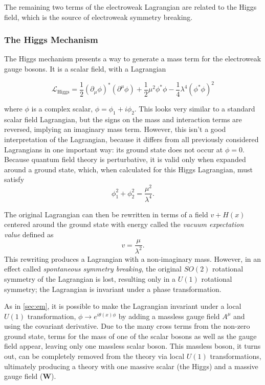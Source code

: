 The remaining two terms of the electroweak Lagrangian are related to the Higgs field, which is the source of electroweak symmetry breaking. 

\subsubsection{The Higgs Mechanism}

The Higgs mechanism presents a way to generate a mass term for the electroweak gauge bosons. It is a scalar field, with a Lagrangian 

\begin{equation}
\mathcal{L}_\text{Higgs} = \frac{1}{2}(\partial_\mu\phi)^*(\partial^\mu\phi) + \frac{1}{2}\mu^2\phi^*\phi - \frac{1}{4}\lambda^4(\phi^*\phi)^2
\end{equation}

where $\phi$ is a complex scalar, $\phi = \phi_1 + i\phi_2$. This looks very similar to a standard scalar field Lagrangian, but the signs on the mass and interaction terms are reversed, implying an imaginary mass term. However, this isn't a good interpretation of the Lagrangian, because it differs from all previously considered Lagrangians in one important way: its ground state does not occur at $\phi = 0$. Because quantum field theory is perturbative, it is valid only when expanded around a ground state, which, when calculated for this Higgs Lagrangian, must satisfy
%
\begin{equation}
\phi_1^2 + \phi_2^2 = \frac{\mu^2}{\lambda^4} . 
\end{equation}

The original Lagrangian can then be rewritten in terms of a field $v + H(x)$ centered around the ground state with energy called the \textit{vacuum expectation value} defined as 
%
\begin{equation}
v = \frac{\mu}{\lambda^2} . 
\end{equation}
%
This rewriting produces a Lagrangian with a non-imaginary mass. However, in an effect called \textit{spontaneous symmetry breaking}, the original $SO(2)$ rotational symmetry of the Lagrangian is lost, resulting only in a $U(1)$ rotational symmetry; the Lagrangian is invariant under a phase transformation.

As in \autoref{sec:em}, it is possible to make the Lagrangian invariant under a local $U(1)$ transformation, $\phi \rightarrow e^{i\theta(x)\phi}$ by adding a massless gauge field $A^\mu$ and using the covariant derivative. Due to the many cross terms from the non-zero ground state, terms for the mass of one of the scalar bosons as well as the gauge field appear, leaving only one massless scalar boson. This massless boson, it turns out, can be completely removed from the theory via local $U(1)$ transformations, ultimately producing a theory with one massive scalar (the Higgs) and a massive gauge field ($\bm{W}$). 

